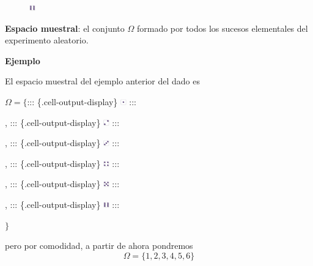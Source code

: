 \documentclass[
  letterpaper,
  DIV=11,
  numbers=noendperiod]{scrreprt}
\begin{document}
\begin{figure}

{\centering \includegraphics[width=0.1in,height=\textheight]{Images/proba1dibujos/dice/6.png}

}

\end{figure}

\textbf{Espacio muestral}: el conjunto \(\Omega\) formado por todos los
sucesos elementales del experimento aleatorio.

\textbf{Ejemplo}

El espacio muestral del ejemplo anterior del dado es

\(\Omega=\Big\{\)::: \{.cell-output-display\}
\includegraphics[width=0.1in,height=\textheight]{Images/proba1dibujos/dice/1.png}
:::

, ::: \{.cell-output-display\}
\includegraphics[width=0.1in,height=\textheight]{Images/proba1dibujos/dice/2.png}
:::

, ::: \{.cell-output-display\}
\includegraphics[width=0.1in,height=\textheight]{Images/proba1dibujos/dice/3.png}
:::

, ::: \{.cell-output-display\}
\includegraphics[width=0.1in,height=\textheight]{Images/proba1dibujos/dice/4.png}
:::

, ::: \{.cell-output-display\}
\includegraphics[width=0.1in,height=\textheight]{Images/proba1dibujos/dice/5.png}
:::

, ::: \{.cell-output-display\}
\includegraphics[width=0.1in,height=\textheight]{Images/proba1dibujos/dice/6.png}
:::

\(\Big\}\)

pero por comodidad, a partir de ahora pondremos
\[\Omega = \{1,2,3,4,5,6\}\]
\end{document}
